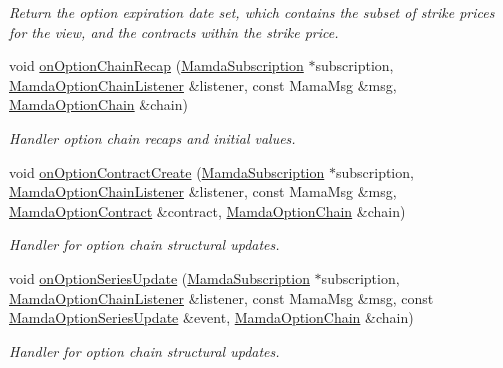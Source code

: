 \begin{CompactItemize}
\begin{CompactList}\small\item\em Return the option expiration date set, which contains the subset of strike prices for the view, and the contracts within the strike price. \item\end{CompactList}\item 
void \hyperlink{classWombat_1_1MamdaOptionChainView_462b2193ed1b852f15859742008dd5b7}{on\-Option\-Chain\-Recap} (\hyperlink{classWombat_1_1MamdaSubscription}{Mamda\-Subscription} $\ast$subscription, \hyperlink{classWombat_1_1MamdaOptionChainListener}{Mamda\-Option\-Chain\-Listener} \&listener, const Mama\-Msg \&msg, \hyperlink{classWombat_1_1MamdaOptionChain}{Mamda\-Option\-Chain} \&chain)
\begin{CompactList}\small\item\em Handler option chain recaps and initial values. \item\end{CompactList}\item 
void \hyperlink{classWombat_1_1MamdaOptionChainView_ebb618efb4207ac512e1a1dda0b5cc73}{on\-Option\-Contract\-Create} (\hyperlink{classWombat_1_1MamdaSubscription}{Mamda\-Subscription} $\ast$subscription, \hyperlink{classWombat_1_1MamdaOptionChainListener}{Mamda\-Option\-Chain\-Listener} \&listener, const Mama\-Msg \&msg, \hyperlink{classWombat_1_1MamdaOptionContract}{Mamda\-Option\-Contract} \&contract, \hyperlink{classWombat_1_1MamdaOptionChain}{Mamda\-Option\-Chain} \&chain)
\begin{CompactList}\small\item\em Handler for option chain structural updates. \item\end{CompactList}\item 
void \hyperlink{classWombat_1_1MamdaOptionChainView_749c42258d71ce7e20d6d2cd71b22d13}{on\-Option\-Series\-Update} (\hyperlink{classWombat_1_1MamdaSubscription}{Mamda\-Subscription} $\ast$subscription, \hyperlink{classWombat_1_1MamdaOptionChainListener}{Mamda\-Option\-Chain\-Listener} \&listener, const Mama\-Msg \&msg, const \hyperlink{classWombat_1_1MamdaOptionSeriesUpdate}{Mamda\-Option\-Series\-Update} \&event, \hyperlink{classWombat_1_1MamdaOptionChain}{Mamda\-Option\-Chain} \&chain)
\begin{CompactList}\small\item\em Handler for option chain structural updates. \item\end{CompactList}\item 

\end{CompactItemize}

